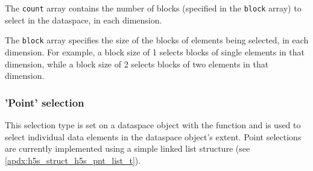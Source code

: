 \documentclass[../HDF5_RFC.tex]{subfiles}
\begin{document}
The \texttt{count} array contains the number of blocks (specified in the \texttt{block}
array) to select in the dataspace, in each dimension.

The \texttt{block} array specifies the size of the blocks of elements being selected,
in each dimension. For example, a block size of 1 selects blocks of single elements in
that dimension, while a block size of 2 selects blocks of two elements in that dimension.

\subsubsection{'Point' selection}

This selection type is set on a dataspace object with the 
function and is used to select individual data elements in the dataspace object's extent.
Point selections are currently implemented using a simple linked list structure (see
\ref{apdx:h5s_struct_h5s_pnt_list_t}).
\end{document}
